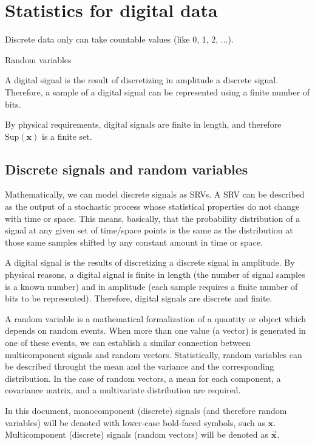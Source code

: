 \chapter{Statistics for digital data}


Discrete data only can take countable values (like 0, 1, 2, ...).

Random variables

A digital signal is the result of discretizing in amplitude a discrete
signal. Therefore, a sample of a digital signal can be represented
using a finite number of bits.

By physical requirements, digital signals are finite in length, and therefore
$\text{Sup}(\mathbf{x})$ is a finite set.

\section{Discrete signals and random variables}
\label{sec:DSRV}

Mathematically, we can model discrete signals as \glspl{SRV}. A
\gls{SRV} can be described as the output of a stochastic process whose
statistical properties do not change with time or space. This means,
basically, that the probability distribution of a signal at any given
set of time/space points is the same as the distribution at those same
samples shifted by any constant amount in time or space.

A digital signal is the results of discretizing a discrete signal in
amplitude. By physical reasons, a digital signal is finite in length
(the number of signal samples is a known number) and in amplitude
(each sample requires a finite number of bits to be
represented). Therefore, digital signals are discrete and finite.

A random variable is a mathematical formalization of a quantity or
object which depends on random events. When more than one value (a
vector) is generated in one of these events, we can establish a
similar connection between multicomponent signals and random
vectors. Statistically, random variables can be described throught the
mean and the variance and the corresponding distribution. In the case
of random vectors, a mean for each component, a covariance matrix, and
a multivariate distribution are required.

In this document, monocomponent (discrete) signals (and therefore
random variables) will be denoted with lower-case bold-faced symbols,
such as $\mathbf{x}$. Multicomponent (discrete) signals (random
vectors) will be denoted as $\overrightarrow{\mathbf{x}}$.

